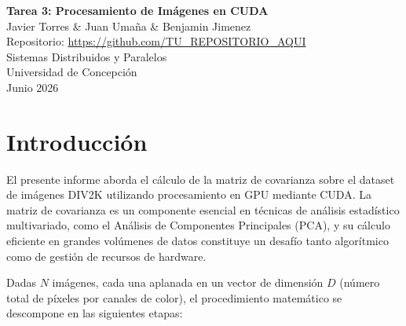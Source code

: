 \documentclass[12pt, a4paper]{article}
\begin{document}
\begin{center}
    {\LARGE \textbf{Tarea 3: Procesamiento de Imágenes en CUDA}} \\[0.5cm]
    {\large Javier Torres \& Juan Umaña \& Benjamin Jimenez} \\[0.2cm]
    {\small Repositorio: \url{https://github.com/TU_REPOSITORIO_AQUI}} \\[0.5cm]
    {\large Sistemas Distribuidos y Paralelos} \\
    {\large Universidad de Concepción} \\
    {\large Junio 2026} \\[1cm]
\end{center}

\section{Introducción}

El presente informe aborda el cálculo de la matriz de covarianza sobre el
dataset de imágenes DIV2K utilizando procesamiento en GPU mediante CUDA. La
matriz de covarianza es un componente esencial en técnicas de análisis
estadístico multivariado, como el Análisis de Componentes Principales (PCA),
y su cálculo eficiente en grandes volúmenes de datos constituye un desafío
tanto algorítmico como de gestión de recursos de hardware.

Dadas $N$ imágenes, cada una aplanada en un vector de dimensión $D$ (número
total de píxeles por canales de color), el procedimiento matemático se
descompone en las siguientes etapas:
\end{document}

